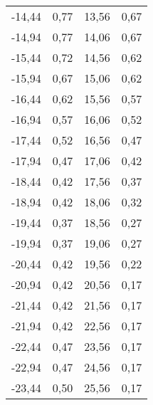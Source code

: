 \begin{table}[h!]
\begin{tabular}{c c c c}
	 -14,44	  	& 0,77 & 13,56	  	& 0,67\\
	 -14,94	  	& 0,77 & 14,06	  	& 0,67\\
	 -15,44	  	& 0,72 & 14,56	  	& 0,62\\
	 -15,94	  	& 0,67 & 15,06	  	& 0,62\\
	 -16,44	  	& 0,62 & 15,56	  	& 0,57\\
	 -16,94	  	& 0,57 & 16,06	  	& 0,52\\
	 -17,44	  	& 0,52 & 16,56	  	& 0,47\\
	 -17,94	  	& 0,47 & 17,06	  	& 0,42\\
	 -18,44	  	& 0,42 & 17,56	  	& 0,37\\
	 -18,94	  	& 0,42 & 18,06	  	& 0,32\\
	 -19,44	  	& 0,37 & 18,56	  	& 0,27\\
	 -19,94	  	& 0,37 & 19,06	  	& 0,27\\
	 -20,44	  	& 0,42 & 19,56	  	& 0,22\\
	 -20,94	  	& 0,42 & 20,56	  	& 0,17\\
	 -21,44	  	& 0,42 & 21,56	  	& 0,17\\
	 -21,94	  	& 0,42 & 22,56	  	& 0,17\\
	 -22,44	  	& 0,47 & 23,56	  	& 0,17\\
	 -22,94	    &	0,47 & 24,56	  	& 0,17\\
	 -23,44	  	& 0,50 & 25,56	  	& 0,17\\



\bottomrule
\end{tabular}
\end{table}
